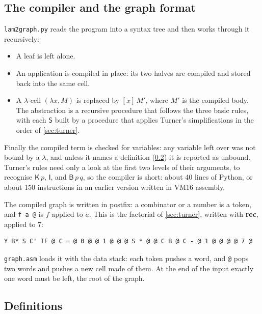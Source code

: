 \documentclass[11pt,a4paper]{article}
\newcommand{\cmb}[1]{\textsf{#1}}
\newcommand{\I}{\cmb{I}}
\newcommand{\K}{\cmb{K}}
\newcommand{\Sc}{\cmb{S}}
\newcommand{\B}{\cmb{B}}
\newcommand{\abs}[2]{[#1]\,#2}
\theoremstyle{definition}
\theoremstyle{plain}
\begin{document}
\subsection{The compiler and the graph format}

\texttt{lam2graph.py} reads the program into a syntax tree and then works
through it recursively:

\begin{itemize}[itemsep=2pt]
\item A leaf is left alone.
\item An application is compiled in place: its two halves are compiled and
  stored back into the same cell.
\item A $\lambda$-cell $(\lambda x, M)$ is replaced by $\abs{x}{M'}$, where
  $M'$ is the compiled body. The abstraction is a recursive procedure that
  follows the three basic rules, with each $\Sc$ built by a procedure that
  applies Turner's simplifications in the order of \cref{sec:turner}.
\end{itemize}

\noindent
Finally the compiled term is checked for variables: any variable left over
was not bound by a $\lambda$, and unless it names a definition
(\cref{sec:defs}) it is reported as unbound. Turner's rules need
only a look at the first two levels of their arguments, to recognise
$\K\,p$, $\I$, and $\B\,p\,q$, so the compiler is short: about 40 lines of
Python, or about 150 instructions in an earlier version written in VM16
assembly.

The compiled graph is written in postfix: a combinator or a number is a
token, and \texttt{f a @} is $f$ applied to $a$. This is the factorial of
\cref{sec:turner}, written with \textbf{rec}, applied to 7:
\begin{lstlisting}[style=plain]
Y B* S C' IF @ C = @ 0 @ @ 1 @ @ @ S * @ @ C B @ C - @ 1 @ @ @ @ 7 @
\end{lstlisting}
\texttt{graph.asm} loads it with the data stack: each token pushes a word, and
\texttt{@} pops two words and pushes a new cell made of them. At the end of
the input exactly one word must be left, the root of the graph.

\subsection{Definitions}\label{sec:defs}
\end{document}

